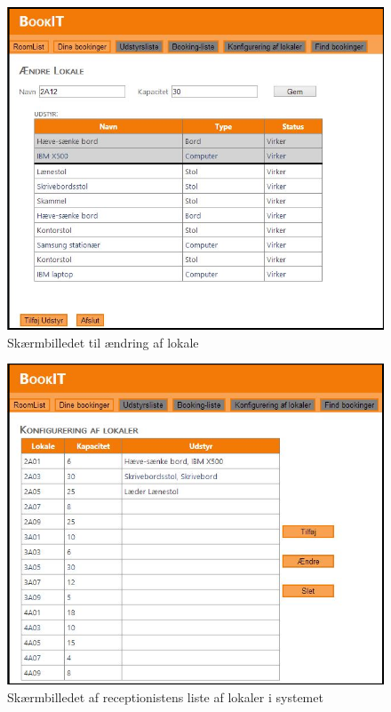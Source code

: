 \begin{figure}[h!]
  \centering
    \includegraphics[width=\textwidth]{Appendix/GUI-Prototype/DigitalMockup/AendreLokale}
  \caption{Skærmbilledet til ændring af lokale}
\label{App_GUI_final_AendreLokale}
\end{figure}

\begin{figure}[h!]
  \centering
    \includegraphics[width=\textwidth]{Appendix/GUI-Prototype/DigitalMockup/LokaleListe}
  \caption{Skærmbilledet af receptionistens liste af lokaler i systemet}
\label{App_GUI_final_LokaleListe}
\end{figure}